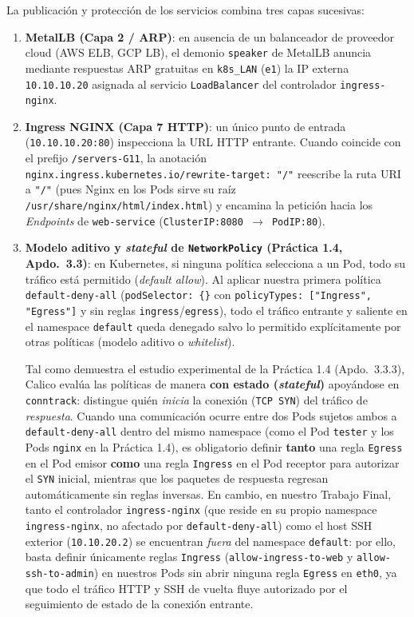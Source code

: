 La publicación y protección de los servicios combina tres capas sucesivas:
\begin{enumerate}
  \item \textbf{MetalLB (Capa 2 / ARP)}: en ausencia de un balanceador de proveedor cloud (AWS ELB, GCP LB), el demonio \texttt{speaker} de MetalLB anuncia mediante respuestas ARP gratuitas en \texttt{k8s\_LAN} (\texttt{e1}) la IP externa \texttt{10.10.10.20} asignada al servicio \texttt{LoadBalancer} del controlador \texttt{ingress-nginx}.
  \item \textbf{Ingress NGINX (Capa 7 HTTP)}: un único punto de entrada (\texttt{10.10.10.20:80}) inspecciona la URL HTTP entrante. Cuando coincide con el prefijo \texttt{/servers-G11}, la anotación \texttt{nginx.ingress.kubernetes.io/rewrite-target: "/"} reescribe la ruta URI a \texttt{"/"} (pues Nginx en los Pods sirve su raíz \texttt{/usr/share/nginx/html/index.html}) y encamina la petición hacia los \textit{Endpoints} de \texttt{web-service} (\texttt{ClusterIP:8080 $\rightarrow$ PodIP:80}).
  \item \textbf{Modelo aditivo y \textit{stateful} de \texttt{NetworkPolicy} (Práctica 1.4, Apdo.~3.3)}: en Kubernetes, si ninguna política selecciona a un Pod, todo su tráfico está permitido (\textit{default allow}). Al aplicar nuestra primera política \texttt{default-deny-all} (\texttt{podSelector: \{\}} con \texttt{policyTypes: ["Ingress", "Egress"]} y sin reglas \texttt{ingress}/\texttt{egress}), todo el tráfico entrante y saliente en el namespace \texttt{default} queda denegado salvo lo permitido explícitamente por otras políticas (modelo aditivo o \textit{whitelist}).

  Tal como demuestra el estudio experimental de la Práctica 1.4 (Apdo.~3.3.3), Calico evalúa las políticas de manera \textbf{con estado (\textit{stateful})} apoyándose en \texttt{conntrack}: distingue quién \emph{inicia} la conexión (\texttt{TCP SYN}) del tráfico de \emph{respuesta}. Cuando una comunicación ocurre entre dos Pods sujetos ambos a \texttt{default-deny-all} dentro del mismo namespace (como el Pod \texttt{tester} y los Pods \texttt{nginx} en la Práctica 1.4), es obligatorio definir \textbf{tanto} una regla \texttt{Egress} en el Pod emisor \textbf{como} una regla \texttt{Ingress} en el Pod receptor para autorizar el \texttt{SYN} inicial, mientras que los paquetes de respuesta regresan automáticamente sin reglas inversas. En cambio, en nuestro Trabajo Final, tanto el controlador \texttt{ingress-nginx} (que reside en su propio namespace \texttt{ingress-nginx}, no afectado por \texttt{default-deny-all}) como el host SSH exterior (\texttt{10.10.20.2}) se encuentran \emph{fuera} del namespace \texttt{default}: por ello, basta definir únicamente reglas \texttt{Ingress} (\texttt{allow-ingress-to-web} y \texttt{allow-ssh-to-admin}) en nuestros Pods sin abrir ninguna regla \texttt{Egress} en \texttt{eth0}, ya que todo el tráfico HTTP y SSH de vuelta fluye autorizado por el seguimiento de estado de la conexión entrante.
\end{enumerate}

